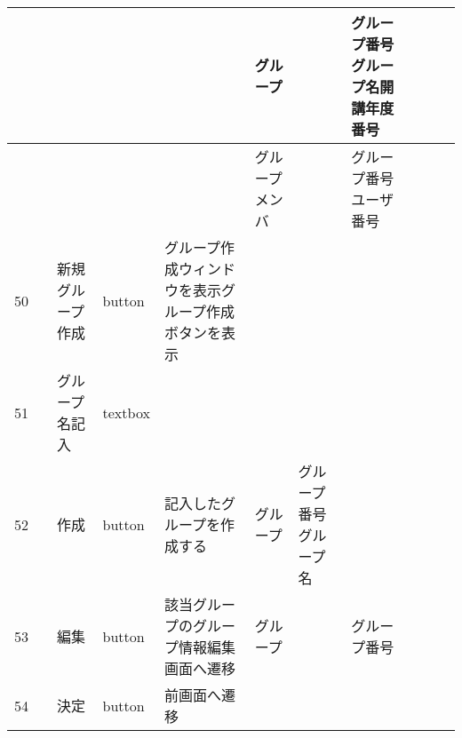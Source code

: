 \begin{landscape}
\begin{table}[]
\begin{tabular}{|l|l|l|l|l|l|l|l|l|l|l|}
    &               &                  &          &                                                                   & グループ    &                       & グループ番号グループ名開講年度番号  &                 &                               &                                                                \\ \hline
    &               &                  &          &                                                                   & グループメンバ &                       & グループ番号ユーザ番号        &                 &                               &                                                                \\ \hline
50  &               & 新規グループ作成         & button   & グループ作成ウィンドウを表示グループ作成ボタンを表示                                        &         &                       &                    &                 &                               &                                                                \\ \hline
51  &               & グループ名記入          & textbox  &                                                                   &         &                       &                    &                 &                               &                                                                \\ \hline
52  &               & 作成               & button   & 記入したグループを作成する                                                     & グループ    & グループ番号グループ名           &                    &                 &                               &                                                                \\ \hline
53  &               & 編集               & button   & 該当グループのグループ情報編集画面へ遷移                                              & グループ    &                       & グループ番号             &                 &                               &                                                                \\ \hline
54  &               & 決定               & button   & 前画面へ遷移                                                            &         &                       &                    &                 &                               &                                                                \\ \hline
\end{tabular}
\end{table}


\end{landscape}

